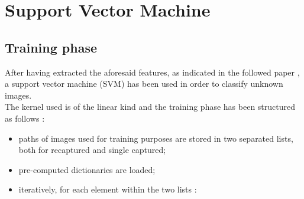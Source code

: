 \section{Support Vector Machine}
\subsection{Training phase}
After having extracted the aforesaid features, as indicated in the followed paper \cite{paper}, a support vector machine (SVM) has been used in order to classify unknown images.\\
The kernel used is of the linear kind and the training phase has been structured as follows :
\begin{itemize}
    \item paths of images used for training purposes are stored in two separated lists, both for recaptured and single captured;
    \item pre-computed dictionaries are loaded;
    \item iteratively, for each element within the two lists : 

\end{itemize}
